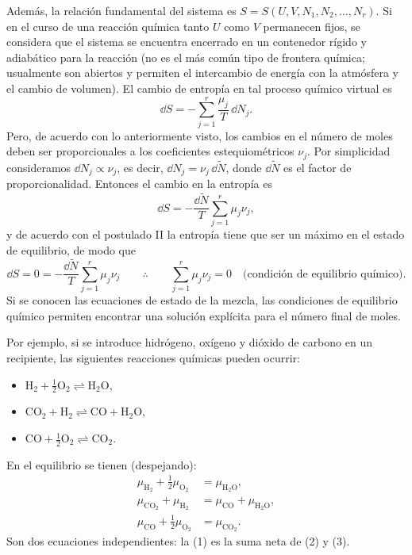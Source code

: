 Además, la relación fundamental del sistema es $S=S(U,V,N_1,N_2,\dots,N_r)$. Si en el curso de una
reacción química tanto $U$ como $V$ permanecen fijos, se considera que el sistema se encuentra
encerrado en un contenedor rígido y adiabático para la reacción (no es el más común tipo de
frontera química; usualmente son abiertos y permiten el intercambio de energía con la atmósfera y
el cambio de volumen). El cambio de entropía en tal proceso químico virtual es
\begin{equation*}
  \dd S=-\sum_{j=1}^{r}\frac{\mu_j}{T}\,\dd N_j.
\end{equation*}
Pero, de acuerdo con lo anteriormente visto, los cambios en el número de moles deben ser
proporcionales a los coeficientes estequiométricos $\nu_j$. Por simplicidad consideramos
$\dd N_j\propto\nu_j$, es decir, $\dd N_j=\nu_j\,\dd\tilde{N}$, donde $\dd\tilde{N}$ es el factor de
proporcionalidad. Entonces el cambio en la entropía es
\begin{equation*}
  \dd S=-\frac{\dd\tilde{N}}{T}\sum_{j=1}^{r}\mu_j\nu_j,
\end{equation*}
y de acuerdo con el postulado II la entropía tiene que ser un máximo en el estado de equilibrio, de
modo que
\begin{equation*}
  \dd S=0=-\frac{\dd\tilde{N}}{T}\sum_{j=1}^{r}\mu_j\nu_j
  \qquad\therefore\qquad
  \boxed{\sum_{j=1}^{r}\mu_j\nu_j=0}\quad\text{(condición de equilibrio químico)}.
\end{equation*}
Si se conocen las ecuaciones de estado de la mezcla, las condiciones de equilibrio químico permiten
encontrar una solución explícita para el número final de moles.

Por ejemplo, si se introduce hidrógeno, oxígeno y dióxido de carbono en un recipiente, las
siguientes reacciones químicas pueden ocurrir:
\begin{itemize}[itemsep=0pt]
  \item $\mathrm{H_2}+\tfrac{1}{2}\mathrm{O_2}\rightleftharpoons\mathrm{H_2O}$,
  \item $\mathrm{CO_2}+\mathrm{H_2}\rightleftharpoons\mathrm{CO}+\mathrm{H_2O}$,
  \item $\mathrm{CO}+\tfrac{1}{2}\mathrm{O_2}\rightleftharpoons\mathrm{CO_2}$.
\end{itemize}

En el equilibrio se tienen (despejando):
\begin{align}
  \mu_{\mathrm{H_2}}+\tfrac{1}{2}\mu_{\mathrm{O_2}}&=\mu_{\mathrm{H_2O}},\tag{1}\\
  \mu_{\mathrm{CO_2}}+\mu_{\mathrm{H_2}}&=\mu_{\mathrm{CO}}+\mu_{\mathrm{H_2O}},\tag{2}\\
  \mu_{\mathrm{CO}}+\tfrac{1}{2}\mu_{\mathrm{O_2}}&=\mu_{\mathrm{CO_2}}.\tag{3}
\end{align}
Son dos ecuaciones independientes: la (1) es la suma neta de (2) y (3).

